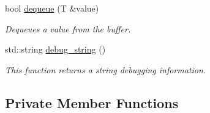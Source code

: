 \begin{DoxyCompactItemize}
bool \hyperlink{classtervel_1_1containers_1_1wf_1_1_ring_buffer_a54ca61cd44983b793173eadca794f64a}{dequeue} (T \&value)
\begin{DoxyCompactList}\small\item\em Dequeues a value from the buffer. \end{DoxyCompactList}\item 
std\+::string \hyperlink{classtervel_1_1containers_1_1wf_1_1_ring_buffer_a461e01d08e025fe89c64e900a219e953}{debug\+\_\+string} ()
\begin{DoxyCompactList}\small\item\em This function returns a string debugging information. \end{DoxyCompactList}\end{DoxyCompactItemize}
\subsection*{Private Member Functions}
